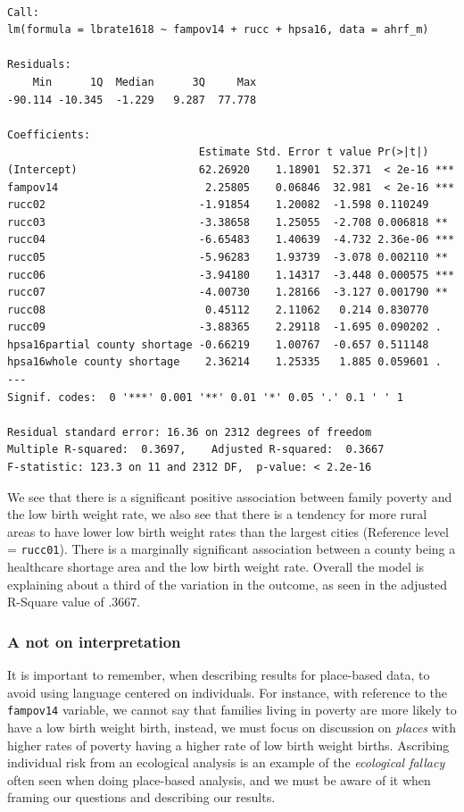 \documentclass[
  letterpaper,
  DIV=11,
  numbers=noendperiod]{scrreprt}
\begin{document}
\begin{verbatim}

Call:
lm(formula = lbrate1618 ~ fampov14 + rucc + hpsa16, data = ahrf_m)

Residuals:
    Min      1Q  Median      3Q     Max 
-90.114 -10.345  -1.229   9.287  77.778 

Coefficients:
                              Estimate Std. Error t value Pr(>|t|)    
(Intercept)                   62.26920    1.18901  52.371  < 2e-16 ***
fampov14                       2.25805    0.06846  32.981  < 2e-16 ***
rucc02                        -1.91854    1.20082  -1.598 0.110249    
rucc03                        -3.38658    1.25055  -2.708 0.006818 ** 
rucc04                        -6.65483    1.40639  -4.732 2.36e-06 ***
rucc05                        -5.96283    1.93739  -3.078 0.002110 ** 
rucc06                        -3.94180    1.14317  -3.448 0.000575 ***
rucc07                        -4.00730    1.28166  -3.127 0.001790 ** 
rucc08                         0.45112    2.11062   0.214 0.830770    
rucc09                        -3.88365    2.29118  -1.695 0.090202 .  
hpsa16partial county shortage -0.66219    1.00767  -0.657 0.511148    
hpsa16whole county shortage    2.36214    1.25335   1.885 0.059601 .  
---
Signif. codes:  0 '***' 0.001 '**' 0.01 '*' 0.05 '.' 0.1 ' ' 1

Residual standard error: 16.36 on 2312 degrees of freedom
Multiple R-squared:  0.3697,    Adjusted R-squared:  0.3667 
F-statistic: 123.3 on 11 and 2312 DF,  p-value: < 2.2e-16
\end{verbatim}

We see that there is a significant positive association between family
poverty and the low birth weight rate, we also see that there is a
tendency for more rural areas to have lower low birth weight rates than
the largest cities (Reference level = \texttt{rucc01}). There is a
marginally significant association between a county being a healthcare
shortage area and the low birth weight rate. Overall the model is
explaining about a third of the variation in the outcome, as seen in the
adjusted R-Square value of .3667.

\hypertarget{a-not-on-interpretation}{%
\subsubsection{A not on interpretation}\label{a-not-on-interpretation}}

It is important to remember, when describing results for place-based
data, to avoid using language centered on individuals. For instance,
with reference to the \texttt{fampov14} variable, we cannot say that
families living in poverty are more likely to have a low birth weight
birth, instead, we must focus on discussion on \emph{places} with higher
rates of poverty having a higher rate of low birth weight births.
Ascribing individual risk from an ecological analysis is an example of
the \emph{ecological fallacy} often seen when doing place-based
analysis, and we must be aware of it when framing our questions and
describing our results.
\end{document}

